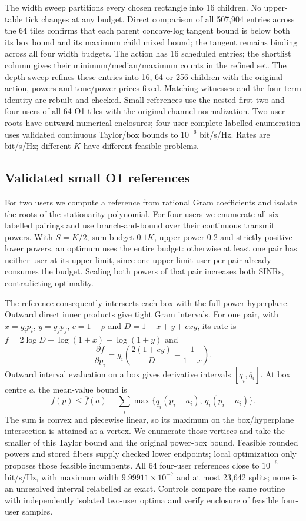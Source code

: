 \documentclass[10pt,letterpaper]{article}
\begin{document}
\begin{table}[htbp]
\begin{minipage}{\linewidth}
The width sweep partitions every chosen rectangle into 16 children. No upper-table tick changes at any budget. Direct comparison of all 507,904 entries across the 64 tiles confirms that each parent concave-log tangent bound is below both its box bound and its maximum child mixed bound; the tangent remains binding across all four width budgets. The action has 16 scheduled entries; the shortlist column gives their minimum/median/maximum counts in the refined set. The depth sweep refines these entries into 16, 64 or 256 children with the original action, powers and tone/power prices fixed. Matching witnesses and the four-term identity are rebuilt and checked. Small references use the nested first two and four users of all 64 O1 tiles with the original channel normalization. Two-user roots have outward numerical enclosures; four-user complete labelled enumeration uses validated continuous Taylor/box bounds to $10^{-6}$ bit/s/Hz. Rates are bit/s/Hz; different $K$ have different feasible problems.
\end{minipage}
\end{table}


\subsection*{Validated small O1 references}
For two users we compute a reference from rational Gram coefficients and isolate the roots of the stationarity polynomial. For four users we enumerate all six labelled pairings and use branch-and-bound over their continuous transmit powers. With \(S=K/2\), sum budget \(0.1K\), upper power 0.2 and strictly positive lower powers, an optimum uses the entire budget: otherwise at least one pair has neither user at its upper limit, since one upper-limit user per pair already consumes the budget. Scaling both powers of that pair increases both SINRs, contradicting optimality.

The reference consequently intersects each box with the full-power hyperplane. Outward direct inner products give tight Gram intervals. For one pair, with \(x=g_i p_i\), \(y=g_j p_j\), \(c=1-\rho\) and \(D=1+x+y+cxy\), its rate is \(f=2\log D-\log(1+x)-\log(1+y)\) and
\[
\frac{\partial f}{\partial p_i}
=g_i\left(\frac{2(1+cy)}{D}-\frac{1}{1+x}\right).
\]
Outward interval evaluation on a box gives derivative intervals \([\underline q_i,\overline q_i]\). At box centre \(a\), the mean-value bound is
\[
f(p)\leq \overline f(a)+
\sum_i\max\{\underline q_i(p_i-a_i),\,\overline q_i(p_i-a_i)\}.
\]
The sum is convex and piecewise linear, so its maximum on the box/hyperplane intersection is attained at a vertex. We enumerate those vertices and take the smaller of this Taylor bound and the original power-box bound. Feasible rounded powers and stored filters supply checked lower endpoints; local optimization only proposes those feasible incumbents. All 64 four-user references close to \(10^{-6}\) bit/s/Hz, with maximum width \(9.99911\times10^{-7}\) and at most 23,642 splits; none is an unresolved interval relabelled as exact. Controls compare the same routine with independently isolated two-user optima and verify enclosure of feasible four-user samples.
\end{document}
